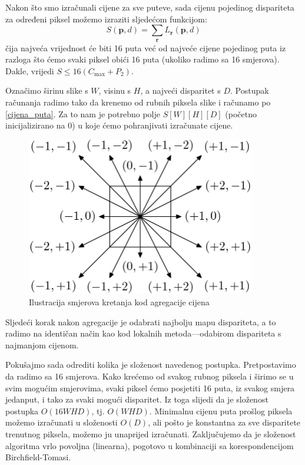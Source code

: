 \documentclass[utf8, zavrsni, numeric]{fer}
\begin{document}
Nakon što smo izračunali cijene za sve puteve, sada cijenu pojedinog dispariteta za određeni
piksel možemo izraziti sljedećom funkcijom:
\begin{equation}
  S(\mathbf{p}, d) = \sum_{\mathbf{r}}L_{\mathbf{r}}(\mathbf{p}, d)
\end{equation}
čija najveća vrijednost će biti 16 puta već od najveće cijene pojedinog puta iz razloga što
ćemo svaki piksel obići 16 puta (ukoliko radimo sa 16 smjerova). Dakle, vrijedi $S \leq 16(C_{\max} + P_2)$.

Označimo širinu slike s $W$, visinu s $H$, a najveći disparitet s $D$.
Postupak računanja radimo tako da krenemo od rubnih piksela slike i računamo po \ref{cijena_puta}. Za to nam je potrebno polje $S[W][H][D]$ (početno inicijalizirano na 0) u koje ćemo pohranjivati izračunate cijene.


\begin{figure}[H]
  \centering
  \includegraphics[width=10cm]{img/sgm_smjerovi.png}
  \caption{Ilustracija smjerova kretanja kod agregacije cijena}
  \label{fig:SGM-paths}
\end{figure}

Sljedeći korak nakon agregacije je odabrati najbolju mapu dispariteta, a to radimo na identičan način
kao kod lokalnih metoda---odabirom dispariteta s najmanjom cijenom.

Pokušajmo sada odrediti kolika je složenost navedenog postupka. Pretpostavimo da radimo sa 16 smjerova. Kako krećemo od svakog rubnog piksela i širimo se u svim mogućim smjerovima, svaki
piksel ćemo posjetiti 16 puta, iz svakog smjera jedanput, i tako za svaki mogući disparitet. Iz toga slijedi da je složenost postupka $O(16WHD)$, tj. $O(WHD)$.
Minimalnu cijenu puta prošlog piksela možemo izračunati u složenosti $O(D)$, ali pošto je konstantna za sve disparitete trenutnog piksela, možemo ju unaprijed izračunati. Zaključujemo da je složenost algoritma vrlo povoljna (linearna), pogotovo u kombinaciji sa korespondencijom Birchfield-Tomasi.
\end{document}
